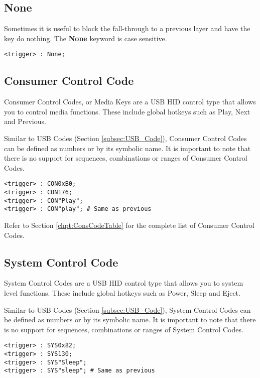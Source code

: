 \documentclass{kiibohd-template}
\begin{document}
\subsection{None}

Sometimes it is useful to block the fall-through to a previous layer and have the key do nothing.
The \textbf{None} keyword is case sensitive.

\begin{lstlisting}
<trigger> : None;
\end{lstlisting}


\subsection{Consumer Control Code}

Consumer Control Codes, or Media Keys are a USB HID control type that allows you to control media functions.
These include global hotkeys such as Play, Next and Previous.

Similar to USB Codes (Section \ref{subsec:USB_Code}), Consumer Control Codes can be defined as numbers or by its symbolic name.
It is important to note that there is no support for sequences, combinations or ranges of Consumer Control Codes.

\begin{lstlisting}
<trigger> : CON0xB0;
<trigger> : CON176;
<trigger> : CON"Play";
<trigger> : CON"play"; # Same as previous
\end{lstlisting}

Refer to Section \ref{chpt:ConsCodeTable} for the complete list of Consumer Control Codes.


\subsection{System Control Code}

System Control Codes are a USB HID control type that allows you to system level functions.
These include global hotkeys such as Power, Sleep and Eject.

Similar to USB Codes (Section \ref{subsec:USB_Code}), System Control Codes can be defined as numbers or by its symbolic name.
It is important to note that there is no support for sequences, combinations or ranges of System Control Codes.

\begin{lstlisting}
<trigger> : SYS0x82;
<trigger> : SYS130;
<trigger> : SYS"Sleep";
<trigger> : SYS"sleep"; # Same as previous
\end{lstlisting}
\end{document}
